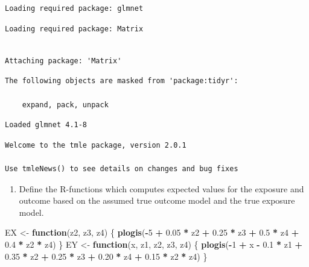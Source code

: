 \documentclass[
]{book}
\newenvironment{Shaded}{\begin{snugshade}}{\end{snugshade}}
\newcommand{\ControlFlowTok}[1]{\textcolor[rgb]{0.13,0.29,0.53}{\textbf{#1}}}
\newcommand{\DecValTok}[1]{\textcolor[rgb]{0.00,0.00,0.81}{#1}}
\newcommand{\FloatTok}[1]{\textcolor[rgb]{0.00,0.00,0.81}{#1}}
\newcommand{\FunctionTok}[1]{\textcolor[rgb]{0.13,0.29,0.53}{\textbf{#1}}}
\newcommand{\NormalTok}[1]{#1}
\newcommand{\OtherTok}[1]{\textcolor[rgb]{0.56,0.35,0.01}{#1}}
\newcommand{\SpecialCharTok}[1]{\textcolor[rgb]{0.81,0.36,0.00}{\textbf{#1}}}
\providecommand{\tightlist}{%
  \setlength{\itemsep}{0pt}\setlength{\parskip}{0pt}}
\begin{document}
\begin{verbatim}
Loading required package: glmnet
\end{verbatim}

\begin{verbatim}
Loading required package: Matrix
\end{verbatim}

\begin{verbatim}

Attaching package: 'Matrix'
\end{verbatim}

\begin{verbatim}
The following objects are masked from 'package:tidyr':

    expand, pack, unpack
\end{verbatim}

\begin{verbatim}
Loaded glmnet 4.1-8
\end{verbatim}

\begin{verbatim}
Welcome to the tmle package, version 2.0.1

Use tmleNews() to see details on changes and bug fixes
\end{verbatim}

\begin{enumerate}
\def\labelenumi{\arabic{enumi}.}
\setcounter{enumi}{1}
\tightlist
\item
  Define the R-functions which computes expected values
  for the exposure and outcome based on the assumed
  true outcome model and the true exposure model.
\end{enumerate}

\begin{Shaded}
\begin{Highlighting}[]
\NormalTok{EX }\OtherTok{\textless{}{-}} \ControlFlowTok{function}\NormalTok{(z2, z3, z4) \{}
  \FunctionTok{plogis}\NormalTok{(}\SpecialCharTok{{-}}\DecValTok{5} \SpecialCharTok{+} \FloatTok{0.05} \SpecialCharTok{*}\NormalTok{ z2 }\SpecialCharTok{+} \FloatTok{0.25} \SpecialCharTok{*}\NormalTok{ z3 }\SpecialCharTok{+} \FloatTok{0.5} \SpecialCharTok{*}\NormalTok{ z4 }\SpecialCharTok{+} \FloatTok{0.4} \SpecialCharTok{*}\NormalTok{ z2 }\SpecialCharTok{*}\NormalTok{ z4)}
\NormalTok{\}}
\NormalTok{EY }\OtherTok{\textless{}{-}} \ControlFlowTok{function}\NormalTok{(x, z1, z2, z3, z4) \{}
  \FunctionTok{plogis}\NormalTok{(}\SpecialCharTok{{-}}\DecValTok{1} \SpecialCharTok{+}\NormalTok{ x }\SpecialCharTok{{-}} \FloatTok{0.1} \SpecialCharTok{*}\NormalTok{ z1 }\SpecialCharTok{+} \FloatTok{0.35} \SpecialCharTok{*}\NormalTok{ z2 }\SpecialCharTok{+} \FloatTok{0.25} \SpecialCharTok{*}\NormalTok{ z3 }\SpecialCharTok{+}
    \FloatTok{0.20} \SpecialCharTok{*}\NormalTok{ z4 }\SpecialCharTok{+} \FloatTok{0.15} \SpecialCharTok{*}\NormalTok{ z2 }\SpecialCharTok{*}\NormalTok{ z4)}
\NormalTok{\}}
\end{Highlighting}
\end{Shaded}
\end{document}

